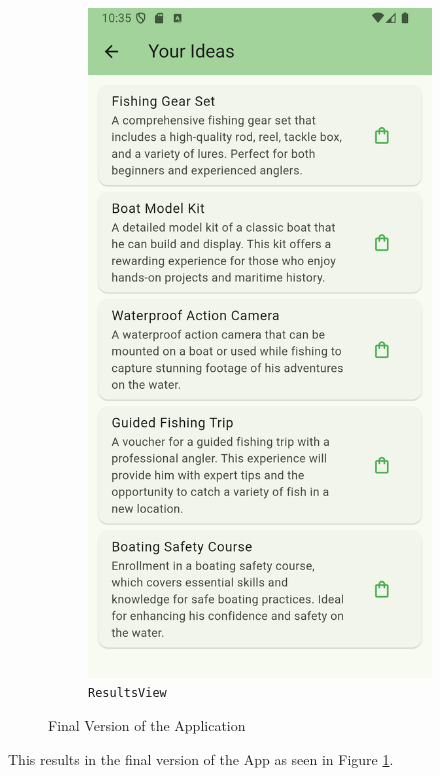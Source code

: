 \begin{figure}
\begin{subfigure}{0.5\textwidth}
		\includegraphics[width=0.9\linewidth]{figures/screenshots/new_results_view_cropped.png}
		\caption{\texttt{ResultsView}}
	\end{subfigure}
	\caption{Final Version of the Application}
	\label{fig:finalVersion}
\end{figure}

This results in the final version of the App as seen in Figure \ref{fig:finalVersion}.

